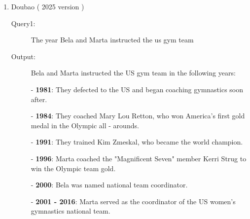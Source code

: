 \begin{enumerate}
\begin{description}
    \end{description}

\item Doubao ( 2025 version ) 
\begin{description}
\item[Query1:] The year Bela and Marta instructed the us gym team 
\item[Output:] Bela and Marta instructed the US gym team in the following years:

- \textbf{1981}: They defected to the US and began coaching gymnastics soon after.

- \textbf{1984}: They coached Mary Lou Retton, who won America's first gold medal in the Olympic all - arounds.

- \textbf{1991}: They trained Kim Zmeskal, who became the world champion.

- \textbf{1996}: Marta coached the "Magnificent Seven" member Kerri Strug to win the Olympic team gold.

- \textbf{2000}: Bela was named national team coordinator.

- \textbf{2001 - 2016}: Marta served as the coordinator of the US women's gymnastics national team.

\end{description}
\end{enumerate}
